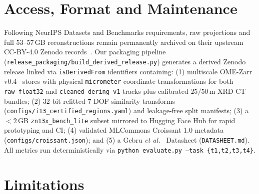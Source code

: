 \documentclass[10pt]{article}
\begin{document}
\section{Access, Format and Maintenance}
\label{sec:access}

Following NeurIPS Datasets and Benchmarks requirements, raw projections and full 53--57\,GB reconstructions remain permanently archived on their upstream CC-BY-4.0 Zenodo records~\cite{green2025synchrotron}. Our packaging pipeline (\texttt{release\_packaging/build\_derived\_release.py}) generates a derived Zenodo release linked via \texttt{isDerivedFrom} identifiers containing: (1) multiscale OME-Zarr v0.4~\cite{moore2021omenext} stores with physical \texttt{micrometer} coordinate transformations for both \texttt{raw\_float32} and \texttt{cleaned\_dering\_v1} tracks plus calibrated $25/50$\,\textmu m XRD-CT bundles; (2) 32-bit-refitted 7-DOF similarity transforms (\texttt{configs/i13\_certified\_regions.yaml}) and leakage-free split manifests; (3) a $< 2$\,GB \texttt{zn13x\_bench\_lite} subset mirrored to Hugging Face Hub for rapid prototyping and CI; (4) validated MLCommons Croissant 1.0 metadata~\cite{akhtar2024croissant} (\texttt{configs/croissant.json}); and (5) a Gebru \emph{et al.}~\cite{gebru2021datasheets} Datasheet (\texttt{DATASHEET.md}). All metrics run deterministically via \texttt{python evaluate.py --task \{t1,t2,t3,t4\}}.

\section{Limitations}
\label{sec:limitations}
\end{document}
